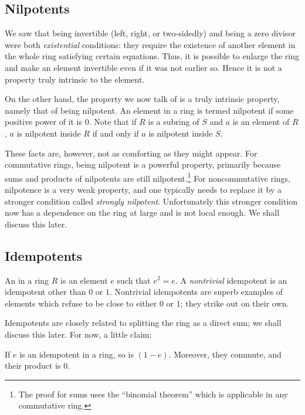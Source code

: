 \documentclass[a4paper]{amsart}
\begin{document}
\subsection{Nilpotents}

We saw that being invertible (left, right, or two-sidedly) and being a
zero divisor were both {\em existential} conditions: they require the
existence of another element in the whole ring satisfying certain
equations. Thus, it is possible to enlarge the ring and make an
element invertible even if it was not earlier so. Hence it is not a
property truly intrinsic to the element.

On the other hand, the property we now talk of is a truly intrinsic
property, namely that of being nilpotent. An element in a ring is
termed nilpotent if some positive power of it is $0$. Note that if $R$
is a subring of $S$ and $a$ is an element of $R$, $a$ is nilpotent
inside $R$ if and only if $a$ is nilpotent inside $S$.

These facts are, however, not as comforting as they might appear. For
commutative rings, being nilpotent is a powerful property, primarily
because sums and products of nilpotents are still
nilpotent.\footnote{The proof for sums uses the ``binomial theorem''
  which is applicable in any commutative ring.}  For noncommutative
rings, nilpotence is a very weak property, and one typically needs to
replace it by a stronger condition called {\em strongly
  nilpotent}. Unfortunately this stronger condition now has a
dependence on the ring at large and is not local enough. We shall
discuss this later.

\subsection{Idempotents}

An  in a ring $R$ is an element
$e$ such that $e^2 = e$.  A {\em nontrivial} idempotent is an
idempotent other than $0$ or $1$. Nontrivial idempotents are superb
examples of elements which refuse to be close to either $0$ or $1$;
they strike out on their own.

Idempotents are closely related to splitting the ring as a direct sum;
we shall discuss this later. For now, a little claim:

\begin{claimer}
  If $e$ is an idempotent in a ring, so is $(1 - e)$. Moreover, they
  commute, and their product is $0$.
\end{claimer}
\end{document}
